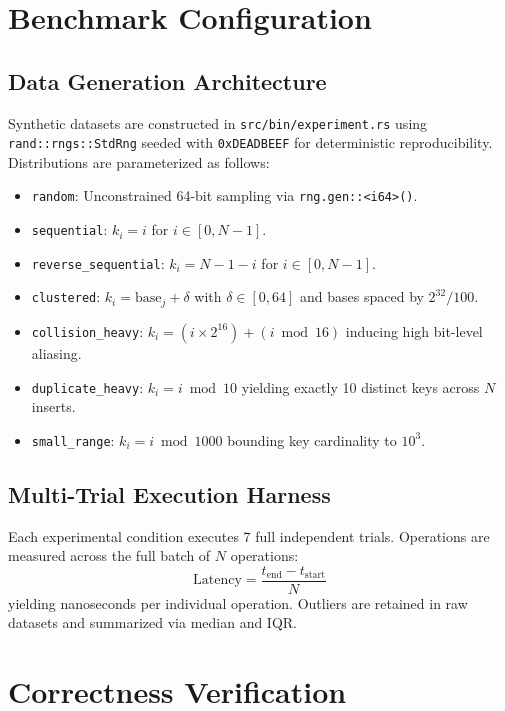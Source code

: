 \documentclass[conference]{IEEEtran}
\begin{document}
\section{Benchmark Configuration}

\subsection{Data Generation Architecture}
Synthetic datasets are constructed in \texttt{src/bin/experiment.rs} using \texttt{rand::rngs::StdRng} seeded with \texttt{0xDEADBEEF} for deterministic reproducibility. Distributions are parameterized as follows:
\begin{itemize}
  \item \texttt{random}: Unconstrained 64-bit sampling via \texttt{rng.gen::<i64>()}.
  \item \texttt{sequential}: $k_i = i$ for $i \in [0, N-1]$.
  \item \texttt{reverse\_sequential}: $k_i = N - 1 - i$ for $i \in [0, N-1]$.
  \item \texttt{clustered}: $k_i = \text{base}_j + \delta$ with $\delta \in [0, 64]$ and bases spaced by $2^{32} / 100$.
  \item \texttt{collision\_heavy}: $k_i = (i \times 2^{16}) + (i \bmod 16)$ inducing high bit-level aliasing.
  \item \texttt{duplicate\_heavy}: $k_i = i \bmod 10$ yielding exactly 10 distinct keys across $N$ inserts.
  \item \texttt{small\_range}: $k_i = i \bmod 1000$ bounding key cardinality to $10^3$.
\end{itemize}

\subsection{Multi-Trial Execution Harness}
Each experimental condition executes 7 full independent trials. Operations are measured across the full batch of $N$ operations:
\begin{equation}
\text{Latency} = \frac{t_\text{end} - t_\text{start}}{N}
\end{equation}
yielding nanoseconds per individual operation. Outliers are retained in raw datasets and summarized via median and IQR.

\section{Correctness Verification}
\end{document}

